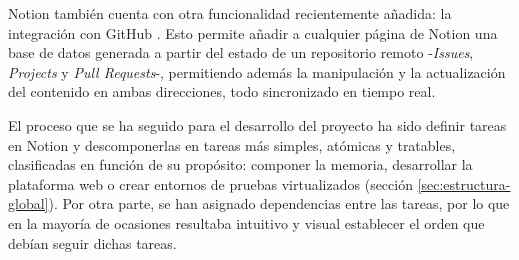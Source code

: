         Notion también cuenta con otra funcionalidad recientemente añadida: la integración con GitHub \cite{github}. Esto permite añadir a cualquier página de Notion una base de datos generada a partir del estado de un repositorio remoto -\textit{Issues}, \textit{Projects} y \textit{Pull Requests}-, permitiendo además la manipulación y la actualización del contenido en ambas direcciones, todo sincronizado en tiempo real. 

        El proceso que se ha seguido para el desarrollo del proyecto ha sido definir tareas en Notion y descomponerlas en tareas más simples, atómicas y tratables, clasificadas en función de su propósito: componer la memoria, desarrollar la plataforma web o crear entornos de pruebas virtualizados (sección \ref{sec:estructura-global}). Por otra parte, se han asignado dependencias entre las tareas, por lo que en la mayoría de ocasiones resultaba intuitivo y visual establecer el orden que debían seguir dichas tareas.

        \newpage

